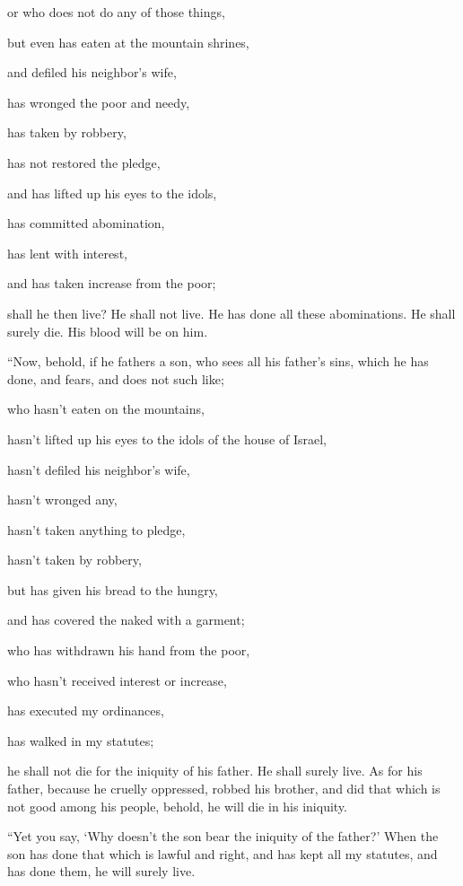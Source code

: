 {or who does not do any of those things,
\par }{\Q but even has eaten at the mountain shrines,
\par }{\QB and defiled his neighbor’s wife,
\par }{\Q {}has wronged the poor and needy,
\par }{\QB has taken by robbery,
\par }{\Q has not restored the pledge,
\par }{\QB and has lifted up his eyes to the idols,
\par }{\QB has committed abomination,
\par }{\Q {}has lent with interest,
\par }{\QB and has taken increase from the poor;
\par }{\MM shall he then live? He shall not live. He has done all these abominations. He shall surely die. His blood will be on him.
\par }{\PP {}“Now, behold, if he fathers a son, who sees all his father’s sins, which he has done, and fears, and does not such like;
\par }{\Q {}who hasn’t eaten on the mountains,
\par }{\QB hasn’t lifted up his eyes to the idols of the house of Israel,
\par }{\QB hasn’t defiled his neighbor’s wife,
\par }{\Q {}hasn’t wronged any,
\par }{\QB hasn’t taken anything to pledge,
\par }{\Q hasn’t taken by robbery,
\par }{\QB but has given his bread to the hungry,
\par }{\QB and has covered the naked with a garment;
\par }{\Q {}who has withdrawn his hand from the poor,
\par }{\QB who hasn’t received interest or increase,
\par }{\Q has executed my ordinances,
\par }{\QB has walked in my statutes;
\par }{\MM he shall not die for the iniquity of his father. He shall surely live.
As for his father, because he cruelly oppressed, robbed his brother, and did that which is not good among his people, behold, he will die in his iniquity.
\par }{\PP {}“Yet you say, ‘Why doesn’t the son bear the iniquity of the father?’ When the son has done that which is lawful and right, and has kept all my statutes, and has done them, he will surely live.
}
